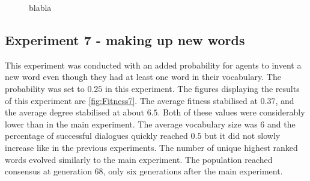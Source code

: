 \begin{figure}[htbp]
    \par \bigskip
    \caption{blabla}
    \label{fig:Fitness6}
\end{figure}


\subsection{Experiment 7 - making up new words}
This experiment was conducted with an added probability for agents to invent a new word even though they had at least one word in their vocabulary. The probability was set to $0.25$ in this experiment. The figures displaying the results of this experiment are \ref{fig:Fitness7}. The average fitness stabilised at $0.37$, and the average degree stabilised at about $6.5$. Both of these values were considerably lower than in the main experiment. The average vocabulary size was $6$ and the percentage of successful dialogues quickly reached $0.5$ but it did not slowly increase like in the previous experiments. The number of unique highest ranked words evolved similarly to the main experiment. The population reached consensus at generation $68$, only six generations after the main experiment. 

